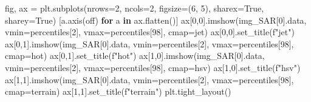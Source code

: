 \documentclass[
  11pt,
  letterpaper,
  open=any,
  twoside=false,
  french]{scrbook}
\newenvironment{Shaded}{\begin{snugshade}}{\end{snugshade}}
\newcommand{\ControlFlowTok}[1]{\textcolor[rgb]{0.00,0.23,0.31}{\textbf{#1}}}
\newcommand{\DecValTok}[1]{\textcolor[rgb]{0.68,0.00,0.00}{#1}}
\newcommand{\KeywordTok}[1]{\textcolor[rgb]{0.00,0.23,0.31}{\textbf{#1}}}
\newcommand{\NormalTok}[1]{\textcolor[rgb]{0.00,0.23,0.31}{#1}}
\newcommand{\OperatorTok}[1]{\textcolor[rgb]{0.37,0.37,0.37}{#1}}
\newcommand{\SpecialStringTok}[1]{\textcolor[rgb]{0.13,0.47,0.30}{#1}}
\newcommand{\StringTok}[1]{\textcolor[rgb]{0.13,0.47,0.30}{#1}}
\newcommand{\VariableTok}[1]{\textcolor[rgb]{0.07,0.07,0.07}{#1}}
\begin{document}
\begin{Shaded}
\begin{Highlighting}[]
\NormalTok{fig, ax }\OperatorTok{=}\NormalTok{ plt.subplots(nrows}\OperatorTok{=}\DecValTok{2}\NormalTok{, ncols}\OperatorTok{=}\DecValTok{2}\NormalTok{, figsize}\OperatorTok{=}\NormalTok{(}\DecValTok{6}\NormalTok{, }\DecValTok{5}\NormalTok{), sharex}\OperatorTok{=}\VariableTok{True}\NormalTok{, sharey}\OperatorTok{=}\VariableTok{True}\NormalTok{)}
\NormalTok{[a.axis(}\StringTok{\textquotesingle{}off\textquotesingle{}}\NormalTok{) }\ControlFlowTok{for}\NormalTok{ a }\KeywordTok{in}\NormalTok{ ax.flatten()]}
\NormalTok{ax[}\DecValTok{0}\NormalTok{,}\DecValTok{0}\NormalTok{].imshow(img\_SAR[}\DecValTok{0}\NormalTok{].data, vmin}\OperatorTok{=}\NormalTok{percentiles[}\DecValTok{2}\NormalTok{], vmax}\OperatorTok{=}\NormalTok{percentiles[}\DecValTok{98}\NormalTok{], cmap}\OperatorTok{=}\StringTok{\textquotesingle{}jet\textquotesingle{}}\NormalTok{)}
\NormalTok{ax[}\DecValTok{0}\NormalTok{,}\DecValTok{0}\NormalTok{].set\_title(}\SpecialStringTok{f"jet"}\NormalTok{)}
\NormalTok{ax[}\DecValTok{0}\NormalTok{,}\DecValTok{1}\NormalTok{].imshow(img\_SAR[}\DecValTok{0}\NormalTok{].data, vmin}\OperatorTok{=}\NormalTok{percentiles[}\DecValTok{2}\NormalTok{], vmax}\OperatorTok{=}\NormalTok{percentiles[}\DecValTok{98}\NormalTok{], cmap}\OperatorTok{=}\StringTok{\textquotesingle{}hot\textquotesingle{}}\NormalTok{)}
\NormalTok{ax[}\DecValTok{0}\NormalTok{,}\DecValTok{1}\NormalTok{].set\_title(}\SpecialStringTok{f"hot"}\NormalTok{)}
\NormalTok{ax[}\DecValTok{1}\NormalTok{,}\DecValTok{0}\NormalTok{].imshow(img\_SAR[}\DecValTok{0}\NormalTok{].data, vmin}\OperatorTok{=}\NormalTok{percentiles[}\DecValTok{2}\NormalTok{], vmax}\OperatorTok{=}\NormalTok{percentiles[}\DecValTok{98}\NormalTok{], cmap}\OperatorTok{=}\StringTok{\textquotesingle{}hsv\textquotesingle{}}\NormalTok{)}
\NormalTok{ax[}\DecValTok{1}\NormalTok{,}\DecValTok{0}\NormalTok{].set\_title(}\SpecialStringTok{f"hsv"}\NormalTok{)}
\NormalTok{ax[}\DecValTok{1}\NormalTok{,}\DecValTok{1}\NormalTok{].imshow(img\_SAR[}\DecValTok{0}\NormalTok{].data, vmin}\OperatorTok{=}\NormalTok{percentiles[}\DecValTok{2}\NormalTok{], vmax}\OperatorTok{=}\NormalTok{percentiles[}\DecValTok{98}\NormalTok{], cmap}\OperatorTok{=}\StringTok{\textquotesingle{}terrain\textquotesingle{}}\NormalTok{)}
\NormalTok{ax[}\DecValTok{1}\NormalTok{,}\DecValTok{1}\NormalTok{].set\_title(}\SpecialStringTok{f"terrain"}\NormalTok{)}
\NormalTok{plt.tight\_layout()}
\end{Highlighting}
\end{Shaded}
\end{document}
